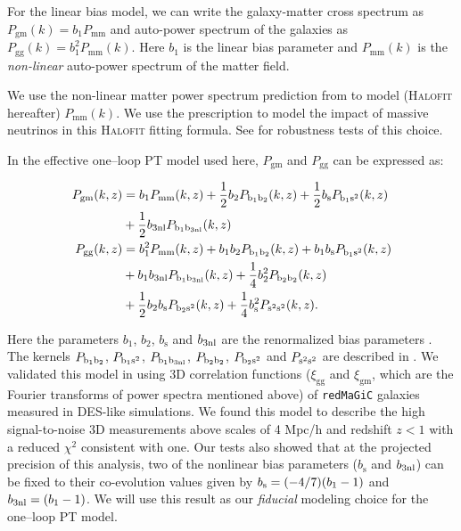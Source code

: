 \documentclass[aps, prd,twocolumn,superscriptaddress,nofootinbib,preprintnumbers]{revtex4-1}
\newcommand{\xigg}{\ensuremath{\xi_{\mathrm{gg}}} }
\newcommand{\xigm}{\ensuremath{\xi_{\mathrm{gm}}} }
\newcommand{\redmagic}{\texttt{redMaGiC} }
\newcommand{\red}[1]{\textcolor{red}{#1}}
\begin{document}
For the linear bias model, we can write the galaxy-matter cross spectrum as $P_{\mathrm{gm}}(k) = b_1 P_{\mathrm{mm}}$ and auto-power spectrum of the galaxies as $P_{\mathrm{gg}}(k) = b_1^2 P_{\mathrm{mm}}(k)$. Here $b_1$ is the linear bias parameter and $P_{\mathrm{mm}}(k)$ is the \emph{non-linear} auto-power spectrum of the matter field. 

We use the non-linear matter power spectrum prediction from \citet{Takahashi:2012em} to model (\textsc{Halofit} hereafter) $P_{\mathrm{mm}}(k)$. We use the  \citet{Bird_halofit} prescription to model the impact of massive neutrinos in this \textsc{Halofit} fitting formula. See \cite{y3-generalmethods} for robustness tests of this choice.  


In the effective one--loop PT model used here, $P_{\mathrm{gm}}$ and $P_{\mathrm{gg}}$ can be expressed as:
\begin{linenomath*}
\begin{align}\label{eq:P_gg_gm}
    P_{\mathrm{gm}}(k, z) &= b_1 P_{\mathrm{mm}}(k, z) +  \frac{1}{2} b_2 P_{\rm b_1 b_2}(k, z) + \frac{1}{2} b_{\mathrm{s}} P_{\rm b_1 s^2}(k, z) \nonumber  \\
    & + \frac{1}{2} b_{\rm 3nl}P_{\rm b_1 b_{\rm 3nl}}(k, z) \\
    P_{\mathrm{gg}}(k, z) &= b_1^2 P_{\mathrm{mm}}(k, z) + b_1 b_2 P_{\rm b_1 b_2}(k, z) + b_1 b_{\mathrm{s}}P_{\rm b_1 s^2}(k, z) \nonumber \\ 
    & + b_1b_{\rm 3nl} P_{\rm b_1 b_{\rm 3nl} }(k, z) + \frac{1}{4}b_2^2 P_{\rm b_2 b_2}(k, z)  \nonumber \\
    &  + \frac{1}{2} b_2 b_{\mathrm{s}}P_{\rm b_2 s^2}(k, z) + \frac{1}{4} b^2_{\mathrm{s}} P_{\rm s^2 s^2}(k, z).  
\end{align}
\end{linenomath*}
Here the parameters $ b_1 $, $ b_2 $, $ b_{\mathrm{s}} $ and $ b_{\rm 3nl} $ are the renormalized bias parameters \citep{McDonald2009}. The kernels $P_{\rm b_1 b_2}$, $P_{\rm b_1 s^2}$, $P_{\rm b_1 b_{\rm 3nl}}$, $P_{\rm b_2 b_2}$, $P_{\rm b_2 s^2}$ and $P_{\rm s^2 s^2}$ are described in \cite{Saito2014a}. We validated this model in \cite{p2020perturbation} using 3D correlation functions ($\xigg$ and $\xigm$, which are the Fourier transforms of power spectra mentioned above) of \redmagic galaxies measured in DES-like simulations. We found this model to describe the high signal-to-noise 3D measurements above scales of 4 Mpc/h and redshift $z < 1$ with a reduced $\chi^2$ consistent with one. Our tests also showed that at the projected precision of this analysis, two of the nonlinear bias parameters ($ b_{\mathrm{s}} $ and $ b_{\rm 3nl} $) can be fixed to their co-evolution values given by $b_{\rm s} = (-4/7) (b_1 - 1)$ and $b_{\rm 3nl} = (b_1 - 1)$. We will use this result as our \textit{fiducial} modeling choice for the one--loop PT model. 
\end{document}
